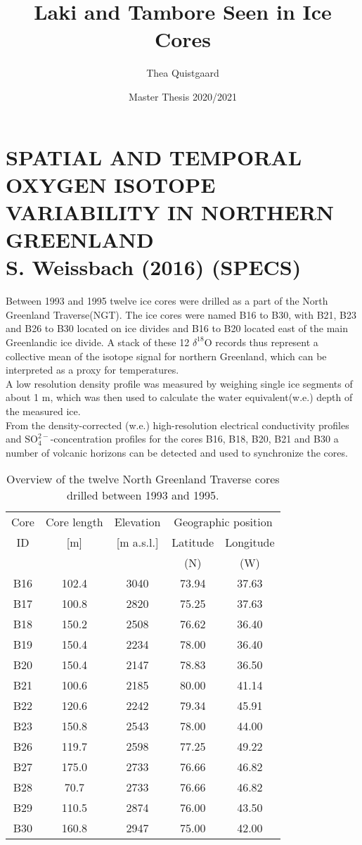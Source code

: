\documentclass[11pt]{article}
\title{Laki and Tambore Seen in Ice Cores}
\author{Thea Quistgaard}
\date{Master Thesis 2020/2021}
\begin{document}
\maketitle





\section{SPATIAL AND TEMPORAL OXYGEN ISOTOPE VARIABILITY IN NORTHERN GREENLAND\\ S. Weissbach (2016) (SPECS)}
Between 1993 and 1995 twelve ice cores were drilled as a part of the North Greenland Traverse(NGT). The ice cores were named B16 to B30, with B21, B23 and B26 to B30 located on ice divides and B16 to B20 located east of the main Greenlandic ice divide. A stack of these 12 $\delta^{18}\text{O}$ records thus represent a collective mean of the isotope signal for northern Greenland, which can be interpreted as a proxy for temperatures. \\
A low resolution density profile was measured by weighing single ice segments of about 1 m, which was then used to calculate the water equivalent(w.e.) depth of the measured ice. \\
From the density-corrected (w.e.) high-resolution electrical conductivity profiles and $\text{SO}_4^{2-}$-concentration profiles for the cores B16, B18, B20, B21 and B30 a number of volcanic horizons can be detected and used to synchronize the cores.

\begin{table}
	\centering
	\begin{tabular}{c c c c c}
		\toprule
		Core & Core length & Elevation & \multicolumn{2}{c}{Geographic position} \\ \cmidrule{4-5}
		ID & [m] & [m a.s.l.] & Latitude & Longitude\\
		& & & (\degree N) &  (\degree W) \\
		\midrule
		B16 & 102.4 & 3040 & 73.94 & 37.63\\
		B17 & 100.8 & 2820 & 75.25 & 37.63\\
		B18 & 150.2 & 2508 & 76.62 & 36.40\\
		B19 & 150.4 & 2234 & 78.00 & 36.40\\
		B20 & 150.4 & 2147 & 78.83 & 36.50\\
		B21 & 100.6 & 2185 & 80.00 & 41.14\\
		B22 & 120.6 & 2242 & 79.34 & 45.91\\
		B23 & 150.8 & 2543 & 78.00 & 44.00\\
		B26 & 119.7 & 2598 & 77.25 & 49.22\\
		B27 & 175.0 & 2733 & 76.66 & 46.82\\
		B28 & 70.7 & 2733 & 76.66 & 46.82\\
		B29 & 110.5 & 2874 & 76.00 & 43.50\\
		B30 & 160.8 & 2947 & 75.00 & 42.00\\	
		\bottomrule
	\end{tabular}
	\label{Tab:NGT_Bcores}
	\caption{Overview of the twelve North Greenland Traverse cores drilled between 1993 and 1995.}
\end{table}
\end{document}
